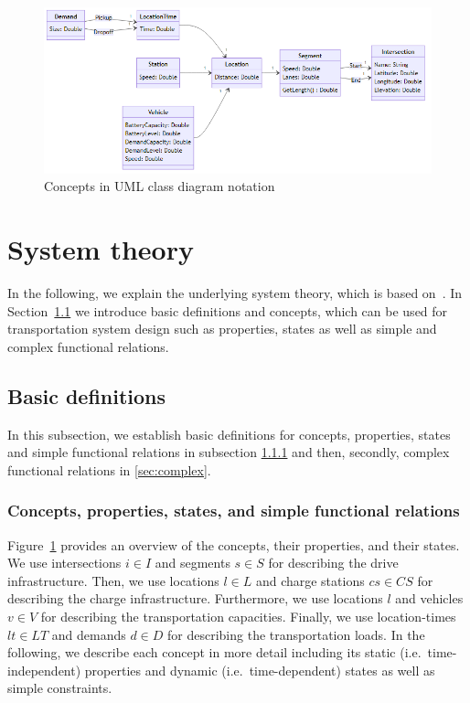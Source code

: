 \documentclass[graybox]{svmult}
\begin{document}
\begin{figure}[t]
	\centering
	\includegraphics[scale=0.35]{../../diagrams/model/classes-v0.png}
	\caption{Concepts in UML class diagram notation}
	\label{fig:concepts}
\end{figure}

\newpage

\section{System theory}
\label{sec:theory}
In the following, we explain the underlying system theory, which is based on~\cite{Ascher2014,Ascher2015,Ascher2016,Ascher2017}.
In Section~\ref{sec:concepts} we introduce basic definitions and concepts, which can be used for transportation system design such as properties, states as well as simple and complex functional relations. 


\subsection{Basic definitions}
\label{sec:concepts}
In this subsection, we establish basic definitions for concepts, properties, states and simple functional relations in subsection \ref{sec:simple} and then, secondly, complex functional relations in \ref{sec:complex}.

\subsubsection{Concepts, properties, states, and simple functional relations}
\label{sec:simple}
Figure~\ref{fig:concepts} provides an overview of the concepts, their properties, and their states.
We use intersections $i \in I$ and segments $s \in S$ for describing the drive infrastructure.
Then, we use locations $l \in L$ and charge stations $cs \in CS$ for describing the charge infrastructure.
Furthermore, we use locations $l$ and vehicles $v \in V$ for describing the transportation capacities.
Finally, we use location-times $lt \in LT$ and demands $d \in D$ for describing the transportation loads.
In the following, we describe each concept in more detail including its static (i.e.\ time-independent) properties and dynamic (i.e.\ time-dependent) states as well as simple constraints.
\end{document}
